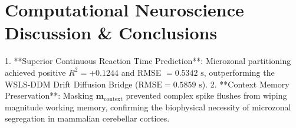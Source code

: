 \documentclass[11pt,a4paper]{article}
\begin{document}
\section{Computational Neuroscience Discussion \& Conclusions}

1. **Superior Continuous Reaction Time Prediction**: Microzonal partitioning achieved positive $R^2 = +0.1244$ and RMSE $= 0.5342\text{ s}$, outperforming the WSLS-DDM Drift Diffusion Bridge ($\text{RMSE} = 0.5859\text{ s}$).
2. **Context Memory Preservation**: Masking $\mathbf{m}_{\text{context}}$ prevented complex spike flushes from wiping magnitude working memory, confirming the biophysical necessity of microzonal segregation in mammalian cerebellar cortices.
\end{document}
